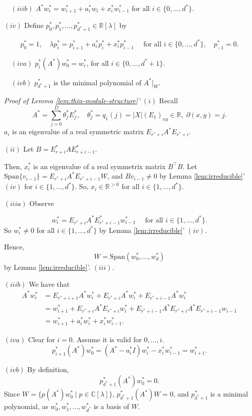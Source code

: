 \documentclass[
]{book}
\theoremstyle{definition}
\theoremstyle{definition}
\theoremstyle{definition}
\theoremstyle{definition}
\theoremstyle{remark}
\begin{document}
\(\quad (iiib)\) \(A^*w^*_i = w^*_{i+1} + a^*_iw_{i} + x^*_iw^*_{i-1}\) for all \(i\in \{0, \ldots, d^*\}\).

\((iv)\) Define \(p^*_0, p^*_1, \ldots, p^*_{d^*+1}\in \mathbb{R}[\lambda]\) by

\[p^*_0 = 1, \quad \lambda p^*_i = p^*_{i+1} + a^*_i p^*_i + x^*_i p^*_{i-1} \quad \text{ for all } i\in \{0, \ldots, d^*\}, \quad p^*_{-1} = 0.\]

\(\quad (iva)\) \(p^*_i(A^*)w^*_0 = w^*_i\), for all \(i\in \{0, \ldots, d^*+1\}\).

\(\quad (ivb)\) \(p^*_{d^*+1}\) is the minimal polynomial of \(A^*|_W\).

\emph{Proof of Lemma \ref{lem:thin-module-structure}'}
\textbar{} \((i)\) Recall
\[A^* = \sum_{j=0}^D\theta^*_jE^*_j, \quad \theta^*_j = q_1(j) = |X|(E_1)_{xy}\in \mathbb{R}, \; \partial(x,y)=j.\]
\(a_i\) is an eigenvalue of a real symmetric matrix \(E_{r^*+i}A^*E_{r^*+i}\).

\((ii)\) Let \(B = E^*_{r+i}AE^*_{r+i-1}\).

Then, \(x^*_i\) is an eigenvalue of a real symmetrix matrix \(B^\top B\).
Let \(\mathrm{Span}\{v_{i-1}\} = E_{r^*+i}A^*E_{r^*+i-1}W\), and \(Bv_{i-1}\neq 0\) by Lemma \ref{lem:irreducible}' \((iv)\) for \(i\in \{1, \ldots, d^*\}\). So, \(x_i\in \mathbb{R}^{>0}\) for all \(i\in \{1, \ldots, d^*\}\).

\((iiia)\) Observe

\[w^*_i = E_{r^*+i}A^*E^*_{r^*+i-1}w^*_{i-1} \quad \text{ for all }i\in \{1, \ldots, d^*\}.\]
So \(w^*_i \neq 0\) for all \(i\in \{1, \ldots, d^*\}\) by Lemma \ref{lem:irreducible}' \((iv)\).

Hence,
\[W = \mathrm{Span}(w^*_0, \ldots, w^*_d)\]
by Lemma \ref{lem:irreducible}'. \((iii)\).

\((iiib)\) We have that
\begin{align}
A^*w^*_i & = E_{r^*+i+1}A^*w^*_i + E_{r^*+i}A^*w^*_i + E_{r^*+i-1}A^*w^*_i\\
& = w^*_{i+1} + E_{r^*+i}A^*E_{r^*+i}w^*_i + E_{r^*+i-1}A^*E_{r^*+i}A^*E_{r^*+i-1}w_{i-1}\\
& = w^*_{i+1} + a^*_iw^*_{i} + x^*_iw^*_{i-1}.
\end{align}

\((iva)\) Clear for \(i=0\). Assume it is valid for \(0, \ldots, i\).
\[p^*_{i+1}(A^*)w^*_0 = (A^*-a^*_iI)w^*_i - x^*_iw^*_{i-1} = w^*_{i+1}.\]

\((ivb)\) By definition,
\[p^*_{d^*+1}(A^*)w^*_0 = 0.\]
Since \(W = \{p(A^*)w^*_0\mid p\in \mathbb{C}[\lambda]\}\), \(p^*_{d^*+1}(A^*)W = 0\), and \(p^*_{d^*+1}\) is a minimal polynomial, as \(w^*_0, w^*_1, \ldots, w^*_{d^*}\) is a basis of \(W\).
\end{document}
